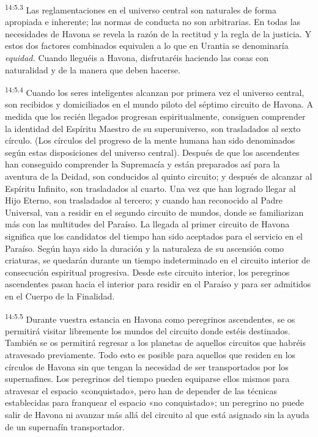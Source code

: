 \par
\textsuperscript{14:5.3} Las reglamentaciones en el universo central son naturales de forma apropiada e inherente; las normas de conducta no son arbitrarias. En todas las necesidades de Havona se revela la razón de la rectitud y la regla de la justicia. Y estos dos factores combinados equivalen a lo que en Urantia se denominaría \textit{equidad.} Cuando lleguéis a Havona, disfrutaréis haciendo las cosas con naturalidad y de la manera que deben hacerse.

\par
\textsuperscript{14:5.4} Cuando los seres inteligentes alcanzan por primera vez el universo central, son recibidos y domiciliados en el mundo piloto del séptimo circuito de Havona. A medida que los recién llegados progresan espiritualmente, consiguen comprender la identidad del Espíritu Maestro de su superuniverso, son trasladados al sexto círculo. (Los círculos del progreso de la mente humana han sido denominados según estas disposiciones del universo central). Después de que los ascendentes han conseguido comprender la Supremacía y están preparados así para la aventura de la Deidad, son conducidos al quinto circuito; y después de alcanzar al Espíritu Infinito, son trasladados al cuarto. Una vez que han logrado llegar al Hijo Eterno, son trasladados al tercero; y cuando han reconocido al Padre Universal, van a residir en el segundo circuito de mundos, donde se familiarizan más con las multitudes del Paraíso. La llegada al primer circuito de Havona significa que los candidatos del tiempo han sido aceptados para el servicio en el Paraíso. Según haya sido la duración y la naturaleza de su ascensión como criaturas, se quedarán durante un tiempo indeterminado en el circuito interior de consecución espiritual progresiva. Desde este circuito interior, los peregrinos ascendentes pasan hacia el interior para residir en el Paraíso y para ser admitidos en el Cuerpo de la Finalidad.

\par
\textsuperscript{14:5.5} Durante vuestra estancia en Havona como peregrinos ascendentes, se os permitirá visitar libremente los mundos del circuito donde estéis destinados. También se os permitirá regresar a los planetas de aquellos circuitos que habréis atravesado previamente. Todo esto es posible para aquellos que residen en los círculos de Havona sin que tengan la necesidad de ser transportados por los supernafines. Los peregrinos del tiempo pueden equiparse ellos mismos para atravesar el espacio «conquistado», pero han de depender de las técnicas establecidas para franquear el espacio «no conquistado»; un peregrino no puede salir de Havona ni avanzar más allá del circuito al que está asignado sin la ayuda de un supernafín transportador.

